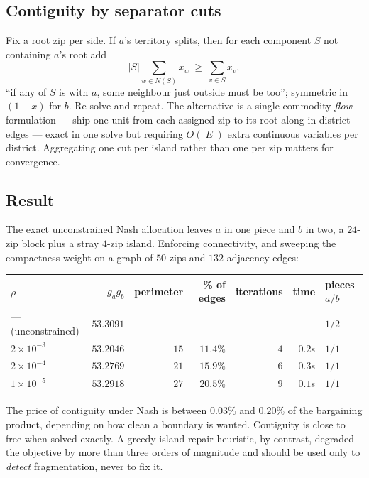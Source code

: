 \documentclass[11pt]{article}
\theoremstyle{remark}\newtheorem*{remark}{Remark}
\begin{document}
\subsection{Contiguity by separator cuts}\label{sec:cuts}
Fix a root zip per side. If $a$'s territory splits, then for each component $S$ not
containing $a$'s root add
\begin{equation}\label{eq:cut}
|S|\sum_{w\in N(S)}x_w\ \ge\ \sum_{v\in S}x_v ,
\end{equation}
``if any of $S$ is with $a$, some neighbour just outside must be too''; symmetric in
$(1-x)$ for $b$. Re-solve and repeat. The alternative is a single-commodity \emph{flow}
formulation --- ship one unit from each assigned zip to its root along in-district
edges --- exact in one solve but requiring $O(|E|)$ extra continuous variables per
district. Aggregating one cut per island rather than one per zip matters for
convergence.

\subsection{Result}
The exact unconstrained Nash allocation leaves $a$ in one piece and $b$ in two, a
$24$-zip block plus a stray $4$-zip island. Enforcing connectivity, and sweeping the
compactness weight on a graph of $50$ zips and $132$ adjacency edges:

\begin{center}\begin{tabular}{lrrrrrl}\toprule
$\rho$ & $g_ag_b$ & perimeter & \% of edges & iterations & time & pieces $a/b$\\ \midrule
--- (unconstrained) & $53.3091$ & --- & --- & --- & --- & $1/2$\\
$2\times10^{-3}$ & $53.2046$ & $15$ & $11.4\%$ & $4$ & $0.2$s & $1/1$\\
$2\times10^{-4}$ & $53.2769$ & $21$ & $15.9\%$ & $6$ & $0.3$s & $1/1$\\
$1\times10^{-5}$ & $53.2918$ & $27$ & $20.5\%$ & $9$ & $0.1$s & $1/1$\\
\bottomrule\end{tabular}\end{center}

\begin{resultbox}
The price of contiguity under Nash is between $0.03\%$ and $0.20\%$ of the bargaining
product, depending on how clean a boundary is wanted. Contiguity is close to free when
solved exactly. A greedy island-repair heuristic, by contrast, degraded the objective by
more than three orders of magnitude and should be used only to \emph{detect}
fragmentation, never to fix it.
\end{resultbox}
\end{document}
